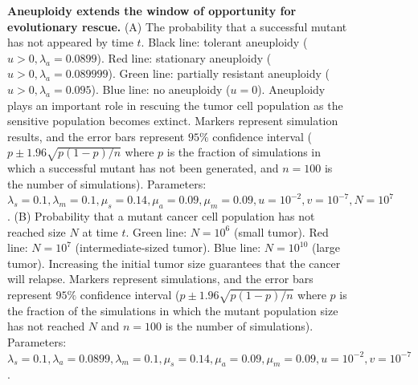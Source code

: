 \documentclass[12pt]{extarticle}
\begin{document}
\begin{figure}
\begin{subfigure}{0.5\textwidth}
\end{subfigure}
\caption{\textbf{Aneuploidy extends the window of opportunity for evolutionary rescue.}
(A) The probability that a successful mutant has not appeared by time $t$. Black line: tolerant aneuploidy ($u>0, \lambda_a=0.0899$). Red line: stationary aneuploidy ($u>0, \lambda_a=0.089999$). Green line: partially resistant aneuploidy ($u>0, \lambda_a=0.095$). Blue line: no aneuploidy ($u=0$). Aneuploidy plays an important role in rescuing the tumor cell population as the sensitive population becomes extinct. Markers represent simulation results, and the error bars represent $95\%$ confidence interval ($p\pm1.96\sqrt{p\left(1-p\right)/n}$ where $p$ is the fraction of simulations in which a successful mutant has not been generated, and $n=100$ is the number of simulations). Parameters: $\lambda_s=0.1,\lambda_m=0.1,\mu_s=0.14,\mu_a=0.09,\mu_m=0.09, u=10^{-2}, v=10^{-7},N=10^7$. %
(B) Probability that a mutant cancer cell population has not reached size $N$ at time $t$. Green line: $N=10^6$ (small tumor). Red line: $N=10^7$ (intermediate-sized tumor). Blue line: $N=10^{10}$ (large tumor). Increasing the initial tumor size guarantees that the cancer will relapse. Markers represent simulations, and the error bars represent $95\%$ confidence interval ($p\pm1.96\sqrt{p\left(1-p\right)/n}$ where $p$ is the fraction of the simulations in which the mutant population size has not reached $N$ and $n=100$ is the number of simulations).
Parameters: $\lambda_s=0.1,\lambda_a=0.0899,\lambda_m=0.1,\mu_s=0.14,\mu_a=0.09,\mu_m=0.09, u=10^{-2}, v=10^{-7}$.}
\label{cdffig}
\end{figure}

\end{document}
